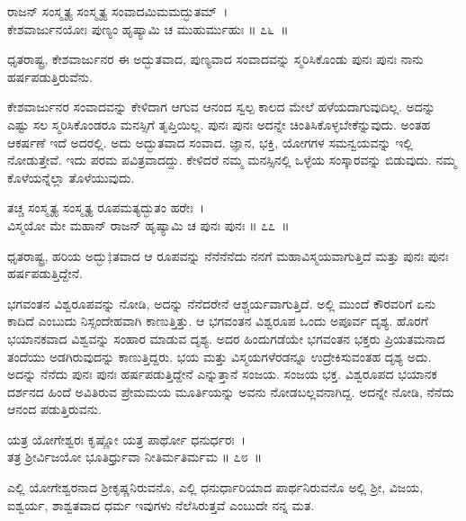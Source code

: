 \begin{shloka}
ರಾಜನ್ ಸಂಸ್ಮೃತ್ಯ ಸಂಸ್ಮೃತ್ಯ ಸಂವಾದಮಿಮಮದ್ಭುತಮ್~।\\ಕೇಶವಾರ್ಜುನಯೋಃ ಪುಣ್ಯಂ ಹೃಷ್ಯಾಮಿ ಚ ಮುಹುರ್ಮುಹುಃ \hfill॥ ೭೬~॥
\end{shloka}

\begin{artha}
ಧೃತರಾಷ್ಟ್ರ, ಕೇಶವಾರ್ಜುನರ ಈ ಅದ್ಭುತವಾದ, ಪುಣ್ಯವಾದ ಸಂವಾದವನ್ನು ಸ್ಮರಿಸಿಕೊಂಡು ಪುನಃ ಪುನಃ ನಾನು ಹರ್ಷಪಡುತ್ತಿರುವೆನು.
\end{artha}

ಕೇಶವಾರ್ಜುನರ ಸಂವಾದವನ್ನು ಕೇಳಿದಾಗ ಆಗುವ ಆನಂದ ಸ್ವಲ್ಪ ಕಾಲದ ಮೇಲೆ ಹಳೆಯ\-ದಾಗುವುದಿಲ್ಲ. ಅದನ್ನು ಎಷ್ಟು ಸಲ ಸ್ಮರಿಸಿಕೊಂಡರೂ ಮನಸ್ಸಿಗೆ ತೃಪ್ತಿಯಿಲ್ಲ. ಪುನಃ ಪುನಃ ಅದನ್ನೇ ಚಿಂತಿಸಿಕೊಳ್ಳಬೇಕೆನ್ನುವುದು. ಅಂತಹ ಆಕರ್ಷಣೆ ಇದೆ ಅದರಲ್ಲಿ. ಅದು ಅದ್ಭುತವಾದ ಸಂವಾದ. ಜ್ಞಾನ, ಭಕ್ತಿ, ಯೋಗಗಳ ಸಮನ್ವಯವನ್ನು ಇಲ್ಲಿ ನೋಡುತ್ತೇವೆ. ಇದು ಪರಮ ಪವಿತ್ರವಾದದ್ದು. ಕೇಳಿದರೆ ನಮ್ಮ ಮನಸ್ಸಿನಲ್ಲಿ ಒಳ್ಳೆಯ ಸಂಸ್ಕಾರವನ್ನು ಬಿಡುವುದು. ನಮ್ಮ ಕೊಳೆಯನ್ನೆಲ್ಲಾ ತೊಳೆಯುವುದು.

\begin{shloka}
ತಚ್ಚ ಸಂಸ್ಮೃತ್ಯ ಸಂಸ್ಮೃತ್ಯ ರೂಪಮತ್ಯದ್ಭುತಂ ಹರೇಃ~।\\ವಿಸ್ಮಯೋ ಮೇ ಮಹಾನ್ ರಾಜನ್ ಹೃಷ್ಯಾಮಿ ಚ ಪುನಃ ಪುನಃ \hfill॥ ೭೭~॥
\end{shloka}

\begin{artha}
ಧೃತರಾಷ್ಟ್ರ, ಹರಿಯ ಅದ್ಭು‡ತವಾದ ಆ ರೂಪವನ್ನು ನೆನೆನೆನೆದು ನನಗೆ ಮಹಾವಿಸ್ಮಯವಾಗುತ್ತಿದೆ ಮತ್ತು ಪುನಃ ಪುನಃ ಹರ್ಷಪಡುತ್ತಿದ್ದೇನೆ.
\end{artha}

ಭಗವಂತನ ವಿಶ್ವರೂಪವನ್ನು ನೋಡಿ, ಅದನ್ನು ನೆನೆದರೇನೆ ಆಶ್ಚರ್ಯವಾಗುತ್ತಿದೆ. ಅಲ್ಲಿ ಮುಂದೆ ಕೌರವರಿಗೆ ಏನು ಕಾದಿದೆ ಎಂಬುದು ನಿಸ್ಸಂದೇಹವಾಗಿ ಕಾಣುತ್ತಿತ್ತು. ಆ ಭಗವಂತನ ವಿಶ್ವರೂಪ ಒಂದು ಅಪೂರ್ವ ದೃಶ್ಯ. ಹೊರಗೆ ಭಯಾನಕವಾದ ವಿಶ್ವವನ್ನು ಸಂಹಾರ ಮಾಡುವ ದೃಶ್ಯ. ಅದರ ಹಿಂದುಗಡೆಯೇ ಭಗವಂತನ ಭಕ್ತರು ಪ್ರಿಯತಮನಾದ ತಂದೆಯು ಅಡಗಿರುವುದನ್ನು ಕಾಣುತ್ತಿದ್ದರು. ಭಯ ಮತ್ತು ವಿಸ್ಮಯಗಳೆರಡನ್ನೂ ಉದ್ರೇಕಿಸುವಂತಹ ದೃಶ್ಯ ಅದು. ಅದನ್ನು ನೆನೆದು ಪುನಃ ಪುನಃ ಹರ್ಷಪಡುತ್ತಿದ್ದೇನೆ ಎನ್ನುತ್ತಾನೆ ಸಂಜಯ. ಸಂಜಯ ಭಕ್ತ. ವಿಶ್ವರೂಪದ ಭಯಾನಕ ದರ್ಶನದ ಹಿಂದೆ ಅವಿತಿರುವ ಪ್ರೇಮಮಯ ಮೂರ್ತಿಯನ್ನು ಅವನು ನೋಡಬಲ್ಲವನಾಗಿದ್ದ. ಅದನ್ನೇ ನೋಡಿ, ನೆನೆದು ಆನಂದ ಪಡುತ್ತಿರುವನು.

\begin{shloka}
ಯತ್ರ ಯೋಗೇಶ್ವರಃ ಕೃಷ್ಣೋ ಯತ್ರ ಪಾರ್ಥೋ ಧನುರ್ಧರಃ~।\\ತತ್ರ ಶ‍್ರೀರ್ವಿಜಯೋ ಭೂತಿರ್ಧ್ರುವಾ ನೀತಿರ್ಮತಿರ್ಮಮ \hfill॥ ೭೮~॥
\end{shloka}

\begin{artha}
ಎಲ್ಲಿ ಯೋಗೇಶ್ವರನಾದ ಶ‍್ರೀಕೃಷ್ಣನಿರುವನೊ, ಎಲ್ಲಿ ಧನುರ್ಧಾರಿಯಾದ ಪಾರ್ಥನಿರುವನೊ ಅಲ್ಲಿ ಶ‍್ರೀ, ವಿಜಯ, ಐಶ್ವರ್ಯ, ಶಾಶ್ವತವಾದ ಧರ್ಮ ಇವುಗಳು ನೆಲೆಸಿರುತ್ತವೆ ಎಂಬುದೇ ನನ್ನ ಮತ.
\end{artha}

